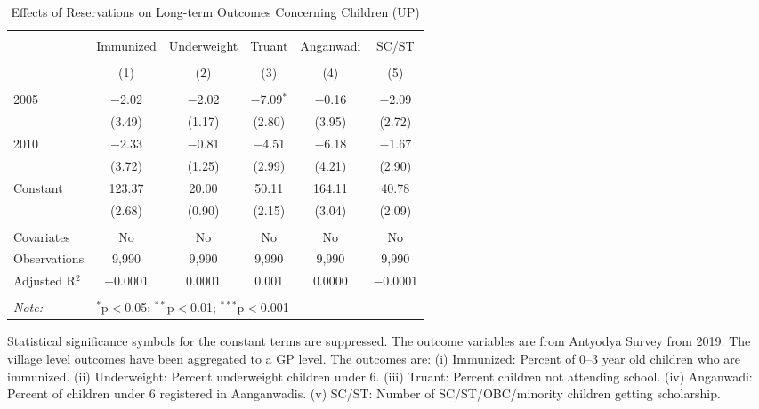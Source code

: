 \begin{table}[!htbp]
\centering
\begin{threeparttable}

  \caption{Effects of Reservations on Long-term Outcomes Concerning Children (UP)} 
  \label{up_shrug_children_05_10} 
\scriptsize 
\begin{tabular}{@{\extracolsep{0pt}}lccccc} 
\\[-1.8ex]\hline 
\hline \\[-1.8ex] 
 & Immunized & Underweight & Truant & Anganwadi & SC/ST \\ 
\\[-1.8ex] & (1) & (2) & (3) & (4) & (5)\\ 
\hline \\[-1.8ex] 
 2005 & $-$2.02 & $-$2.02 & $-$7.09$^{*}$ & $-$0.16 & $-$2.09 \\ 
  & (3.49) & (1.17) & (2.80) & (3.95) & (2.72) \\ 
  2010 & $-$2.33 & $-$0.81 & $-$4.51 & $-$6.18 & $-$1.67 \\ 
  & (3.72) & (1.25) & (2.99) & (4.21) & (2.90) \\ 
  Constant & 123.37 & 20.00 & 50.11 & 164.11 & 40.78 \\ 
  & (2.68) & (0.90) & (2.15) & (3.04) & (2.09) \\ 
 \hline \\[-1.8ex] 
Covariates & No & No & No & No & No \\ 
Observations & 9,990 & 9,990 & 9,990 & 9,990 & 9,990 \\ 
Adjusted R$^{2}$ & $-$0.0001 & 0.0001 & 0.001 & 0.0000 & $-$0.0001 \\ 
\hline 
\hline \\[-1.8ex] 
\textit{Note:}  & \multicolumn{5}{l}{$^{*}$p$<$0.05; $^{**}$p$<$0.01; $^{***}$p$<$0.001} \\ 
\end{tabular} 
\begin{tablenotes}[flushleft]
\scriptsize
\item Statistical significance symbols for the constant terms are suppressed. The outcome variables are from Antyodya Survey from 2019.
                   The village level outcomes have been aggregated to a GP level. The outcomes are:
                   (i) Immunized: Percent of 0--3 year old children who are immunized. 
                   (ii) Underweight: Percent underweight children under 6.
                   (iii) Truant: Percent children not attending school.
                   (iv) Anganwadi: Percent of children under 6 registered in Aanganwadis.
                   (v) SC/ST: Number of SC/ST/OBC/minority children getting scholarship.
\end{tablenotes}
\end{threeparttable}
\end{table}
